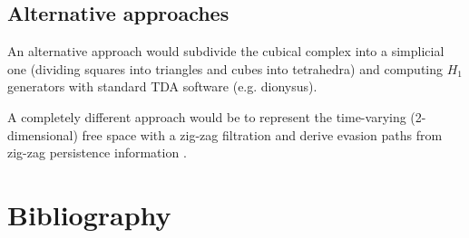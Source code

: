 \documentclass{article}
\begin{document}
\subsection*{Alternative approaches}

An alternative approach would subdivide the cubical complex into a simplicial one (dividing squares into triangles and cubes into tetrahedra) and computing $H_1$ generators with standard TDA software (e.g. dionysus).

A completely different approach would be to represent the time-varying (2-dimensional) free space with a zig-zag filtration and derive evasion paths from zig-zag persistence information \cite{Adams_2014}.


\section{Bibliography}

\printbibliography
\end{document}

